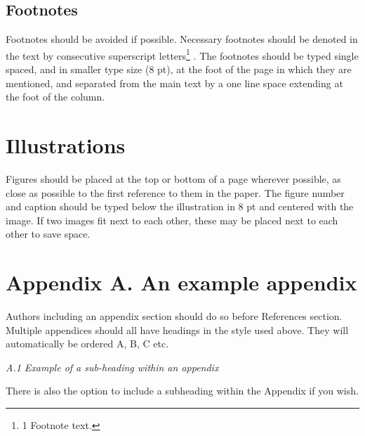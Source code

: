 \documentclass[10pt,twoside]{article}
\begin{document}
\subsection{Footnotes}
Footnotes should be avoided if possible. Necessary footnotes should be denoted in the text by consecutive superscript letters\footnote{1 Footnote text.} \cite{mccabe_system_2023,mccabe_mdocean_2024}. The footnotes should be typed single spaced, and in smaller type size (8 pt), at the foot of the page in which they are mentioned, and separated from the main text by a one line space extending at the foot of the column.

\section{Illustrations}
Figures should be placed at the top or bottom of a page wherever possible, as close as possible to the first reference to them in the paper. The figure number and caption should be typed below the illustration in 8 pt and centered with the image. If two images fit next to each other, these may be placed next to each other to save space.





\vspace{1\baselineskip}

\section*{Appendix A. An example appendix}
Authors including an appendix section should do so before References section. Multiple appendices should all have headings in the style used above. They will automatically be ordered A, B, C etc.

\vspace{1\baselineskip}
\textit{A.1 Example of a sub-heading within an appendix}
\vspace{1\baselineskip}

There is also the option to include a subheading within the Appendix if you wish.


\printbibliography
\end{document}
